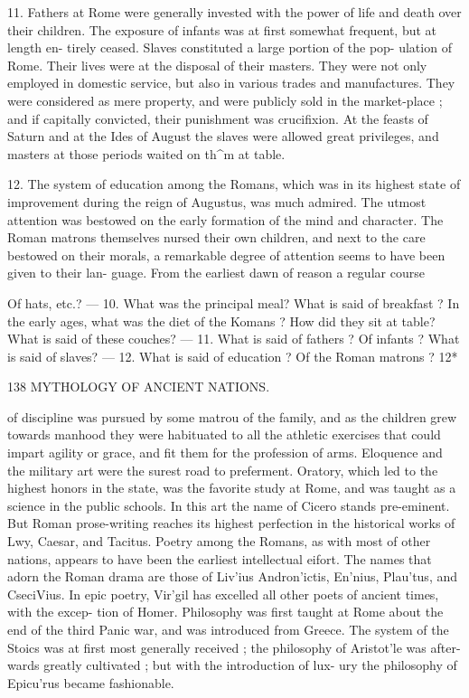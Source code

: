 \documentclass[openany,a4paper]{memoir}
\begin{document}
11. Fathers at Rome were generally invested with the 
power of life and death over their children. The exposure 
of infants was at first somewhat frequent, but at length en- 
tirely ceased. Slaves constituted a large portion of the pop- 
ulation of Rome. Their lives were at the disposal of their 
masters. They were not only employed in domestic service, 
but also in various trades and manufactures. They were 
considered as mere property, and were publicly sold in the 
market-place ; and if capitally convicted, their punishment 
was crucifixion. At the feasts of Saturn and at the Ides of 
August the slaves were allowed great privileges, and masters 
at those periods waited on th^m at table. 

12. The system of education among the Romans, which 
was in its highest state of improvement during the reign of 
Augustus, was much admired. The utmost attention was 
bestowed on the early formation of the mind and character. 
The Roman matrons themselves nursed their own children, 
and next to the care bestowed on their morals, a remarkable 
degree of attention seems to have been given to their lan- 
guage. From the earliest dawn of reason a regular course 

Of hats, etc.? — 10. What was the principal meal? What is said of 
breakfast ? In the early ages, what was the diet of the Komans ? How 
did they sit at table? What is said of these couches? — 11. What is 
said of fathers ? Of infants ? What is said of slaves? — 12. What is said 
of education ? Of the Roman matrons ? 
12* 



138 MYTHOLOGY OF ANCIENT NATIONS. 

of discipline was pursued by some matrou of the family, and 
as the children grew towards manhood they were habituated 
to all the athletic exercises that could impart agility or grace, 
and fit them for the profession of arms. Eloquence and the 
military art were the surest road to preferment. Oratory, 
which led to the highest honors in the state, was the favorite 
study at Rome, and was taught as a science in the public 
schools. In this art the name of Cicero stands pre-eminent. 
But Roman prose-writing reaches its highest perfection in 
the historical works of Lwy, Caesar, and Tacitus. Poetry 
among the Romans, as with most of other nations, appears 
to have been the earliest intellectual eifort. The names that 
adorn the Roman drama are those of Liv'ius Andron'ictis, 
En'nius, Plau'tus, and CseciVius. In epic poetry, Vir'gil 
has excelled all other poets of ancient times, with the excep- 
tion of Homer. Philosophy was first taught at Rome 
about the end of the third Panic war, and was introduced 
from Greece. The system of the Stoics was at first most 
generally received ; the philosophy of Aristot'le was after- 
wards greatly cultivated ; but with the introduction of lux- 
ury the philosophy of Epicu'rus became fashionable. 
\end{document}
